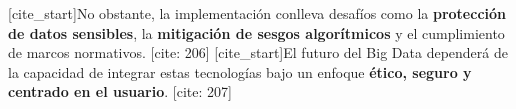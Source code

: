 \documentclass[12pt, a4paper]{article}
\begin{document}
[cite_start]No obstante, la implementación conlleva desafíos como la \textbf{protección de datos sensibles}, la \textbf{mitigación de sesgos algorítmicos} y el cumplimiento de marcos normativos. [cite: 206] [cite_start]El futuro del Big Data dependerá de la capacidad de integrar estas tecnologías bajo un enfoque \textbf{ético, seguro y centrado en el usuario}. [cite: 207]
\end{document}

